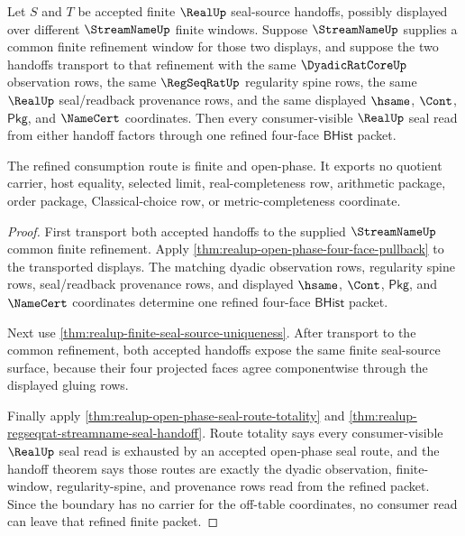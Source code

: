 \begin{theorem}
\label{thm:realup-common-refinement-seal-consumption}
Let $S$ and $T$ be accepted finite $\RealUp$ seal-source handoffs, possibly
displayed over different $\StreamNameUp$ finite windows. Suppose
$\StreamNameUp$ supplies a common finite refinement window for those two
displays, and suppose the two handoffs transport to that refinement with the
same $\DyadicRatCoreUp$ observation rows, the same $\RegSeqRatUp$ regularity
spine rows, the same $\RealUp$ seal/readback provenance rows, and the same
displayed $\hsame$, $\Cont$, $\mathsf{Pkg}$, and $\NameCert$ coordinates.
Then every consumer-visible $\RealUp$ seal read from either handoff factors
through one refined four-face $\mathsf{BHist}$ packet.

The refined consumption route is finite and open-phase. It exports no quotient
carrier, host equality, selected limit, real-completeness row, arithmetic
package, order package, Classical-choice row, or metric-completeness
coordinate.
\end{theorem}
\begin{proof}
First transport both accepted handoffs to the supplied $\StreamNameUp$ common
finite refinement. Apply \autoref{thm:realup-open-phase-four-face-pullback} to
the transported displays. The matching dyadic observation rows, regularity
spine rows, seal/readback provenance rows, and displayed $\hsame$, $\Cont$,
$\mathsf{Pkg}$, and $\NameCert$ coordinates determine one refined four-face
$\mathsf{BHist}$ packet.

Next use \autoref{thm:realup-finite-seal-source-uniqueness}. After transport
to the common refinement, both accepted handoffs expose the same finite
seal-source surface, because their four projected faces agree componentwise
through the displayed gluing rows.

Finally apply \autoref{thm:realup-open-phase-seal-route-totality} and
\autoref{thm:realup-regseqrat-streamname-seal-handoff}. Route totality says
every consumer-visible $\RealUp$ seal read is exhausted by an accepted
open-phase seal route, and the handoff theorem says those routes are exactly
the dyadic observation, finite-window, regularity-spine, and provenance rows
read from the refined packet. Since the boundary has no carrier for the
off-table coordinates, no consumer read can leave that refined finite packet.
\end{proof}

